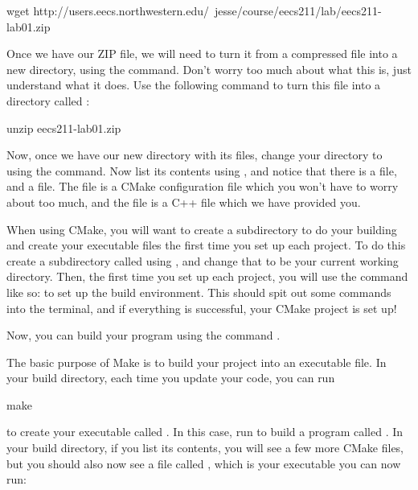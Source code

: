 \documentclass{tufte-handout}
\begin{document}
\begin{CmdLine}
  \prompt wget http://users.eecs.northwestern.edu/~jesse/course/eecs211/lab/eecs211-lab01.zip
\end{CmdLine}

Once we have our ZIP file, we will need to turn it from a compressed
file into a new directory, using the  command.
Don't worry too much
about what this is, just understand what it does.  Use the following
command to turn this file into a directory called
:

\begin{CmdLine}
  \prompt unzip eecs211-lab01.zip
\end{CmdLine}

Now, once we have our new directory with its files, change your
directory to  using the  command.  Now list
its contents using , and notice that there is a
 file, and a  file. The
 file is a CMake configuration file which you
won't have to worry about too much, and the  file is
a C++ file which we have provided you.

When using CMake, you will want to create a subdirectory to do your
building and create your executable files the first time you set up each
project.  To do this create a subdirectory called  using
, and change that to be your current working directory.
Then, the first time you set up each project, you will use the
 command like so:  to set up the build environment.  This should spit
out some commands into the terminal, and if everything is successful,
your CMake project is set up!

Now, you can build your program using the command .

The basic purpose of Make is to build your project into an executable file.
In your build directory, each time you update your code, you can run

\begin{CmdLine}
  \prompt make 
\end{CmdLine}

\noindent to create your executable called .  In
this case, run  to build a program called
.  In your build directory, if you list its contents, you
will see a few more CMake files, but you should also now see a file
called , which is your executable you can now run:
\end{document}
